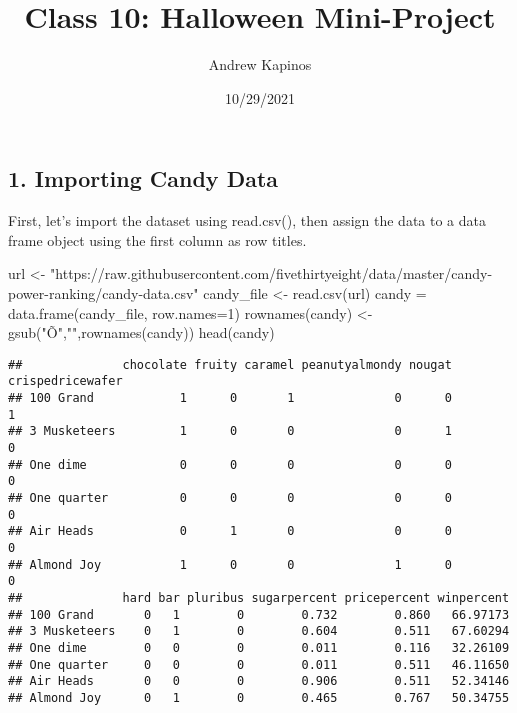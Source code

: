 \documentclass[
]{article}
\title{Class 10: Halloween Mini-Project}
\author{Andrew Kapinos}
\date{10/29/2021}
\newenvironment{Shaded}{\begin{snugshade}}{\end{snugshade}}
\newcommand{\AttributeTok}[1]{\textcolor[rgb]{0.77,0.63,0.00}{#1}}
\newcommand{\DecValTok}[1]{\textcolor[rgb]{0.00,0.00,0.81}{#1}}
\newcommand{\FunctionTok}[1]{\textcolor[rgb]{0.00,0.00,0.00}{#1}}
\newcommand{\NormalTok}[1]{#1}
\newcommand{\OtherTok}[1]{\textcolor[rgb]{0.56,0.35,0.01}{#1}}
\newcommand{\StringTok}[1]{\textcolor[rgb]{0.31,0.60,0.02}{#1}}
\begin{document}
\maketitle

\hypertarget{importing-candy-data}{%
\subsection{1. Importing Candy Data}\label{importing-candy-data}}

First, let's import the dataset using read.csv(), then assign the data
to a data frame object using the first column as row titles.

\begin{Shaded}
\begin{Highlighting}[]
\NormalTok{url }\OtherTok{\textless{}{-}} \StringTok{"https://raw.githubusercontent.com/fivethirtyeight/data/master/candy{-}power{-}ranking/candy{-}data.csv"}
\NormalTok{candy\_file }\OtherTok{\textless{}{-}} \FunctionTok{read.csv}\NormalTok{(url)}
\NormalTok{candy }\OtherTok{=} \FunctionTok{data.frame}\NormalTok{(candy\_file, }\AttributeTok{row.names=}\DecValTok{1}\NormalTok{)}
\FunctionTok{rownames}\NormalTok{(candy) }\OtherTok{\textless{}{-}} \FunctionTok{gsub}\NormalTok{(}\StringTok{"Õ"}\NormalTok{,}\StringTok{"\textquotesingle{}"}\NormalTok{,}\FunctionTok{rownames}\NormalTok{(candy))}
\FunctionTok{head}\NormalTok{(candy)}
\end{Highlighting}
\end{Shaded}

\begin{verbatim}
##              chocolate fruity caramel peanutyalmondy nougat crispedricewafer
## 100 Grand            1      0       1              0      0                1
## 3 Musketeers         1      0       0              0      1                0
## One dime             0      0       0              0      0                0
## One quarter          0      0       0              0      0                0
## Air Heads            0      1       0              0      0                0
## Almond Joy           1      0       0              1      0                0
##              hard bar pluribus sugarpercent pricepercent winpercent
## 100 Grand       0   1        0        0.732        0.860   66.97173
## 3 Musketeers    0   1        0        0.604        0.511   67.60294
## One dime        0   0        0        0.011        0.116   32.26109
## One quarter     0   0        0        0.011        0.511   46.11650
## Air Heads       0   0        0        0.906        0.511   52.34146
## Almond Joy      0   1        0        0.465        0.767   50.34755
\end{verbatim}
\end{document}

